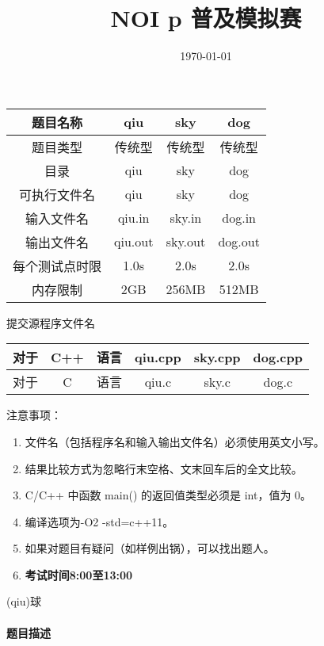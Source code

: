 \documentclass[UTF8]{ctexart}
\begin{document}
\title{NOI p 普及\textbf{模拟}赛}
\author{}
\date{\today}
\maketitle
\begin{table}[!htbp]
	\centering
	\begin{tabular}{|c|c|c|c|}
		\hline
		题目名称&qiu&sky&dog\\
		\hline
		题目类型&传统型&传统型&传统型\\
		\hline
		目录&qiu&sky&dog\\
		\hline
		可执行文件名&qiu&sky&dog\\
		\hline
		输入文件名&qiu.in&sky.in&dog.in\\
		\hline
		输出文件名&qiu.out&sky.out&dog.out\\
		\hline
		每个测试点时限&1.0s&2.0s&2.0s\\
		\hline
		内存限制&2GB&256MB&512MB\\
		\hline
	\end{tabular}
\end{table}
提交源程序文件名
\begin{table}[!htbp]
	\centering
	\begin{tabular}{|ccc|c|c|c|}
		\hline
		对于&C++&语言&qiu.cpp&sky.cpp&dog.cpp\\
		\hline
		对于&C&语言&qiu.c&sky.c&dog.c\\
		\hline
	\end{tabular}
\end{table}
注意事项：
\begin{enumerate}
	\item 文件名（包括程序名和输入输出文件名）必须使用英文小写。
	\item 结果比较方式为忽略行末空格、文末回车后的全文比较。
	\item C/C++ 中函数 main() 的返回值类型必须是 int，值为 0。
	\item 编译选项为-O2 -std=c++11。
	\item 如果对题目有疑问（如样例出锅），可以找出题人。
	\item \textbf{考试时间8:00至13:00}
\end{enumerate}
\clearpage


\begin{center}
	\large{(qiu)球}
\end{center}
\paragraph{题目描述}
\end{document}
